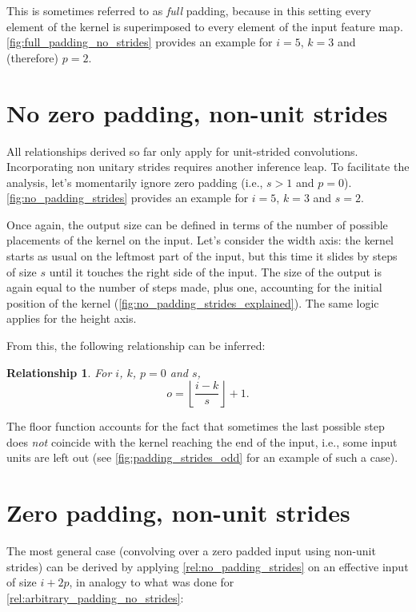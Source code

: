 \documentclass[notitlepage]{report}
\newtheorem{relationship}{Relationship}
\begin{document}
\noindent This is sometimes referred to as {\em full} padding, because in this
setting every element of the kernel is superimposed to every element of the
input feature map. \autoref{fig:full_padding_no_strides} provides an example
for $i = 5$, $k = 3$ and (therefore) $p = 2$.

\section{No zero padding, non-unit strides}

All relationships derived so far only apply for unit-strided convolutions.
Incorporating non unitary strides requires another inference leap. To
facilitate the analysis, let's momentarily ignore zero padding (i.e., $s > 1$
and $p = 0$). \autoref{fig:no_padding_strides} provides an example for $i =
5$, $k = 3$ and $s = 2$.

Once again, the output size can be defined in terms of the number of possible
placements of the kernel on the input. Let's consider the width axis: the
kernel starts as usual on the leftmost part of the input, but this time it
slides by steps of size $s$ until it touches the right side of the input. The
size of the output is again equal to the number of steps made, plus one,
accounting for the initial position of the kernel
(\autoref{fig:no_padding_strides_explained}). The same logic applies for the
height axis.

From this, the following relationship can be inferred:

\begin{relationship}\label{rel:no_padding_strides}
For $i$, $k$, $p = 0$ and $s$,
\begin{equation*}
    o = \left\lfloor \frac{i - k}{s} \right\rfloor + 1.
\end{equation*}
\end{relationship}

\noindent The floor function accounts for the fact that sometimes the last
possible step does {\em not} coincide with the kernel reaching the end of the
input, i.e., some input units are left out (see
\autoref{fig:padding_strides_odd} for an example of such a case).

\section{Zero padding, non-unit strides}

The most general case (convolving over a zero padded input using non-unit
strides) can be derived by applying \autoref{rel:no_padding_strides} on an
effective input of size $i + 2p$, in analogy to what was done for
\autoref{rel:arbitrary_padding_no_strides}:
\end{document}
